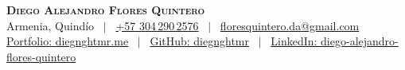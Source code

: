 \begin{center}
    \textbf{\Huge \scshape Diego Alejandro Flores Quintero} \\ \vspace{1pt}
    Armenia, Quindío \ $|$ \
    \href{http://wa.me/+573042902576}{+57 304\,290\,2576} \ $|$ \
    \href{mailto:floresquintero.da@gmail.com}{floresquintero.da@gmail.com} \\[1pt]
    \href{https://www.diegnghtmr.me}{Portfolio: diegnghtmr.me} \ $|$ \
    \href{https://github.com/diegnghtmr}{GitHub: diegnghtmr} \ $|$ \
    \href{https://www.linkedin.com/in/diego-alejandro-flores-quintero/}{LinkedIn: diego-alejandro-flores-quintero}
\end{center}
